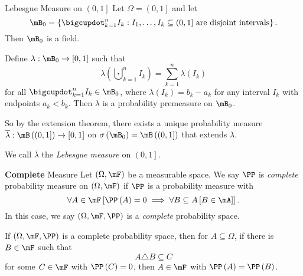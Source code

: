 \documentclass[stat901]{subfiles}
\begin{document}
    \begin{example}{Lebesgue Measure on $\left( 0,1 \right]$}
        Let $\Omega = \left( 0,1 \right]$ and let
        \begin{equation*}
            \mB_0 = \left\lbrace \bigcupdot^{n}_{k=1} I_k : \text{$I_1,\ldots,I_k\subseteq\left( 0,1 \right]$ are disjoint intervals} \right\rbrace.
        \end{equation*}
        Then $\mB_0$ is a field.

        Define $\lambda:\mB_0\to\left[ 0,1 \right]$ such that
        \begin{equation*}
            \lambda\left( \bigcupdot^{n}_{k=1} I_k \right) = \sum^{n}_{k=1} \lambda\left( I_k \right)
        \end{equation*}
        for all $\bigcupdot^{n}_{k=1} I_k\in\mB_0$, where $\lambda\left( I_k \right) = b_k-a_k$ for any interval $I_k$ with endpoints $a_k<b_k$. Then $\lambda$ is a probability premeasure on $\mB_0$.

        So by the extension theorem, there exists a unique probability measure $\overline{\lambda}:\mB\left( \left( 0,1 \right] \right)\to\left[ 0,1 \right]$ on $\sigma\left( \mB_0 \right) = \mB\left( \left( 0,1 \right] \right)$ that extends $\lambda$.

        We call $\overline{\lambda}$ the \emph{Lebesgue measure} on $\left( 0,1 \right]$.
    \end{example}

    \rruleline

    \begin{definition}{\textbf{Complete} Measure}
        Let $\left( \Omega,\mF \right)$ be a measurable space. We say $\PP$ is \emph{complete} probability measure on $\left( \Omega,\mF \right)$ if $\PP$ is a probability measure with
        \begin{equation*}
            \forall A\in\mF\left[ \PP\left( A \right) = 0 \implies \forall B\subseteq A\left[ B\in\mA \right] \right].
        \end{equation*}
        In this case, we say $\left( \Omega,\mF,\PP \right)$ is a \emph{complete} probability space.
    \end{definition}

    \np If $\left( \Omega,\mF,\PP \right)$ is a complete probability space, then for $A\subseteq\Omega$, if there is $B\in\mF$ such that
    \begin{equation*}
        A\triangle B \subseteq C
    \end{equation*}
    for some $C\in\mF$ with $\PP\left( C \right) = 0$, then $A\in\mF$ with $\PP\left( A \right) = \PP\left( B \right)$.
\end{document}
